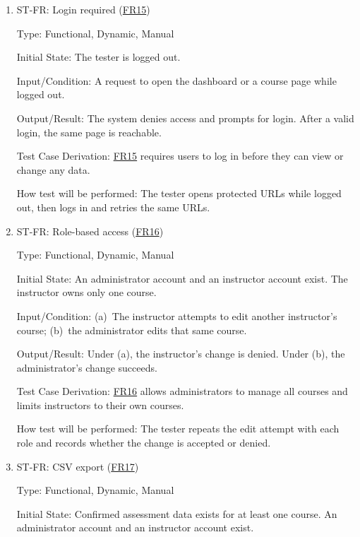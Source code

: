 \documentclass[12pt, titlepage]{article}
\newcounter{stnum}
\newcommand{\frlink}[1]{\href{https://github.com/shivyam/cas-course-optimization/blob/main/pdfs/SRS-IEEE/SRS.pdf}{FR#1}}
\begin{document}
\begin{enumerate}

\item{ST-FR\thestnum \label{ST_Access_Login}: Login required (\frlink{15})\\}

Type: Functional, Dynamic, Manual

Initial State: The tester is logged out.

Input/Condition: A request to open the dashboard or a course page while logged out.

Output/Result: The system denies access and prompts for login. After a valid login, the same page is reachable.

Test Case Derivation: \frlink{15} requires users to log in before they can view or change any data.

How test will be performed: The tester opens protected URLs while logged out, then logs in and retries the same URLs.


\item{ST-FR\thestnum \label{ST_Access_Roles}: Role-based access (\frlink{16})\\}

Type: Functional, Dynamic, Manual

Initial State: An administrator account and an instructor account exist. The instructor owns only one course.

Input/Condition: (a)~The instructor attempts to edit another instructor's course; (b)~the administrator edits that same course.

Output/Result: Under (a), the instructor's change is denied. Under (b), the administrator's change succeeds.

Test Case Derivation: \frlink{16} allows administrators to manage all courses and limits instructors to their own courses.

How test will be performed: The tester repeats the edit attempt with each role and records whether the change is accepted or denied.


\item{ST-FR\thestnum \label{ST_Export_CSV}: CSV export (\frlink{17})\\}

Type: Functional, Dynamic, Manual

Initial State: Confirmed assessment data exists for at least one course. An administrator account and an instructor account exist.


\end{enumerate}
\end{document}
